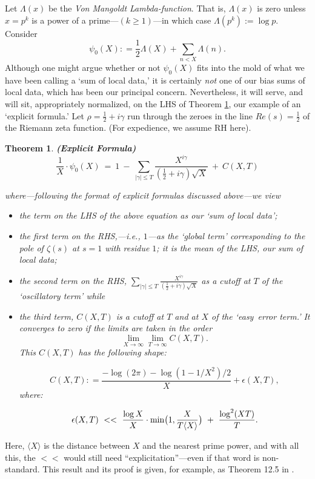 \documentclass[11pt]{article}
\theoremstyle{plain}
\newtheorem{theorem}{Theorem}[section]
\theoremstyle{definition}
\numberwithin{equation}{section}
\numberwithin{figure}{section}
\numberwithin{table}{section}
\def\l{{\Lambda}}
\begin{document}
Let $\l(x)$ be the {\it Von Mangoldt Lambda-function}. That is, $\l(x)$ is zero unless $x= p^k$ is a power of a prime---$(k \ge 1)$---in which case $\l(p^k) := \log p$. Consider  $$\psi_0(X): = {\frac{1}{2}}\l(X) + \sum_{n < X}\l(n).$$ Although one might argue whether or not  $\psi_0(X)$ fits into the mold of what we have been calling a `sum of local data,' it is certainly {\it not} one of our bias sums of local data, which has been our principal concern. Nevertheless, it will serve,   and will sit, appropriately normalized,  on the LHS of Theorem \ref{ef}, our example of an `explicit formula.'
Let $\rho= {\frac{1}{2}}+i\gamma$ run through the zeroes in the line $Re(s)= {\frac{1}{2}}$ of the Riemann zeta function. (For expedience, we assume RH here).

\begin{theorem}\label{ef}{\bf (Explicit Formula)} $${\frac{1}{X}}\cdot \psi_0(X) \ = \ 1 \ - \ \sum_{|\gamma| \le T}{\frac{X^{i\gamma}}{({\frac{1}{2}}+i\gamma){\sqrt X}}} \ + \ C(X,T)$$

where---following the format of explicit formulas discussed above---we view \begin{itemize} \item  the term on the LHS of the above equation as our `sum of local data'; \item  the first term on the {\rm RHS},---i.e.,  $1$---as the `{\it global term}' corresponding to the pole of $\zeta(s)$ at $s=1$ with residue $1$; it is the {\it mean} of the {\rm LHS}, our sum of local data; \item  the second term on the {\rm RHS}, $\sum_{|\gamma| \le T}{\frac{X^{i\gamma}}{({\frac{1}{2}}+i\gamma){\sqrt X}}}$ as  a cutoff at $T$ of  the `{\it oscillatory term}' while \item  the third term, $C(X,T)$ is a cutoff at $T$ and at $X$ of the `{\it easy\ error term}.'  It converges to zero if the limits are taken in the order $$\lim_{X\to \infty}\lim_{T\to \infty}C(X,T).$$ This $C(X,T)$ has the following shape:

$$C(X,T): = {\frac{-\log(2\pi)-\log(1-1/X^2)/2}{ X}} + \epsilon(X,T), $$ where:

$$\epsilon(X,T) \ <<\ {\frac{\log X}{X}}\cdot {\rm min}\big(1, {\frac{X}{T\langle X \rangle}}\big)\ + \ {\frac{\log^2(X T) }{T}}.$$\end{itemize}\end{theorem}

Here, $\langle X \rangle$ is the distance between $X$ and the nearest prime power, and with all this, the $<<$ would still need ``explicitation''---even if that word is non-standard.  This result  and its proof is given, for example, as Theorem 12.5 in \cite{MV}.
\end{document}
